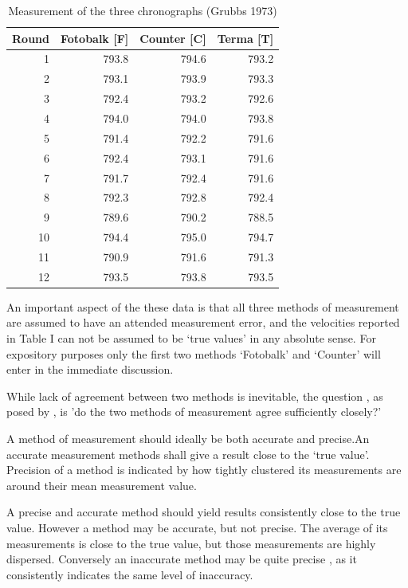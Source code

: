 \documentclass[12pt, a4paper]{report}
\theoremstyle{plain}
\theoremstyle{definition}
\theoremstyle{remark}
\begin{document}
	\begin{table}[ht]
		\begin{center}
			\begin{tabular}{rrrr}
				\hline
				Round& Fotobalk [F] & Counter [C]& Terma [T]\\
				\hline
				1 & 793.8 & 794.6 & 793.2 \\
				2 & 793.1 & 793.9 & 793.3 \\
				3 & 792.4 & 793.2 & 792.6 \\
				4 & 794.0 & 794.0 & 793.8 \\
				5 & 791.4 & 792.2 & 791.6 \\
				6 & 792.4 & 793.1 & 791.6 \\
				7 & 791.7 & 792.4 & 791.6 \\
				8 & 792.3 & 792.8 & 792.4 \\
				9 & 789.6 & 790.2 & 788.5 \\
				10 & 794.4 & 795.0 & 794.7 \\
				11 & 790.9 & 791.6 & 791.3 \\
				12 & 793.5 & 793.8 & 793.5 \\
				\hline
			\end{tabular}
			\caption{Measurement of the three chronographs (Grubbs 1973)}
		\end{center}
	\end{table}
	
	An important aspect of the these data is that all three methods of
	measurement are assumed to have an attended measurement error, and
	the velocities reported in Table I can not be assumed to be `true
	values' in any absolute sense. For expository purposes only the
	first two methods `Fotobalk' and `Counter' will enter in the
	immediate discussion.
	
	While lack of agreement between two methods is inevitable, the question , as
	posed by \citet{BA83}, is 'do the two methods of measurement agree
	sufficiently closely?'
	
	A method of measurement should ideally be both accurate and
	precise.An accurate measurement methods shall give a result close
	to the `true value'. Precision of a method is indicated by how
	tightly clustered its measurements are around their mean
	measurement value.
	
	\newpage
	
	A precise and accurate method should yield results consistently
	close to the true value. However a method may be accurate, but not
	precise. The average of its measurements is close to the true
	value, but those measurements are highly dispersed. Conversely an
	inaccurate method may be quite precise , as it consistently
	indicates the same level of inaccuracy.
	
\end{document}
